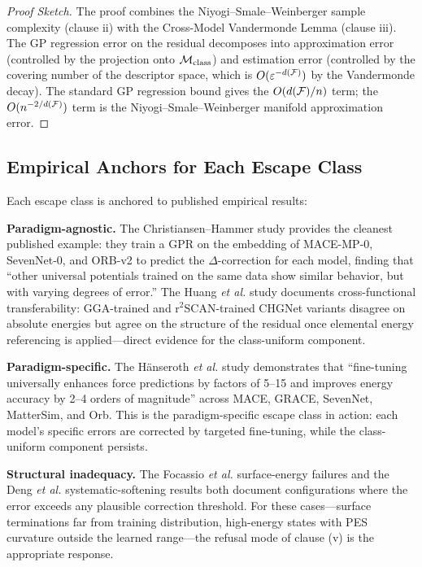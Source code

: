 \begin{proof}[Proof Sketch]
The proof combines the Niyogi--Smale--Weinberger sample complexity (clause ii) with the Cross-Model Vandermonde Lemma (clause iii). The GP regression error on the residual decomposes into approximation error (controlled by the projection onto $\mathcal{M}_{\text{class}}$) and estimation error (controlled by the covering number of the descriptor space, which is $O(\varepsilon^{-d(\mathcal{F})})$ by the Vandermonde decay). The standard GP regression bound\cite{srinivas2009gaussian} gives the $O(d(\mathcal{F})/n)$ term; the $O(n^{-2/d(\mathcal{F})})$ term is the Niyogi--Smale--Weinberger manifold approximation error.
\end{proof}

\subsection{Empirical Anchors for Each Escape Class}

Each escape class is anchored to published empirical results:

\textbf{Paradigm-agnostic.} The Christiansen--Hammer\cite{christiansen2025delta} study provides the cleanest published example: they train a GPR on the embedding of MACE-MP-0, SevenNet-0, and ORB-v2 to predict the $\Delta$-correction for each model, finding that ``other universal potentials trained on the same data show similar behavior, but with varying degrees of error.'' The Huang \emph{et al.}\cite{huang2025crossfunctional} study documents cross-functional transferability: GGA-trained and r$^2$SCAN-trained CHGNet variants disagree on absolute energies but agree on the structure of the residual once elemental energy referencing is applied---direct evidence for the class-uniform component.

\textbf{Paradigm-specific.} The Hänseroth \emph{et al.}\cite{hanseroth2025finetuning} study demonstrates that ``fine-tuning universally enhances force predictions by factors of 5--15 and improves energy accuracy by 2--4 orders of magnitude'' across MACE, GRACE, SevenNet, MatterSim, and Orb. This is the paradigm-specific escape class in action: each model's specific errors are corrected by targeted fine-tuning, while the class-uniform component persists.

\textbf{Structural inadequacy.} The Focassio \emph{et al.}\cite{focassio2025surfaces} surface-energy failures and the Deng \emph{et al.}\cite{deng2025systematic} systematic-softening results both document configurations where the error exceeds any plausible correction threshold. For these cases---surface terminations far from training distribution, high-energy states with PES curvature outside the learned range---the refusal mode of clause (v) is the appropriate response.
